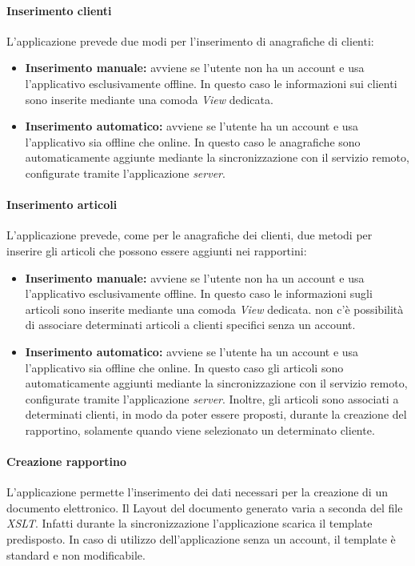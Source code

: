 \paragraph{Inserimento clienti}
L'applicazione prevede due modi per l'inserimento di anagrafiche di clienti:
\begin{itemize}
	\item \textbf{Inserimento manuale:} avviene se l'utente non ha un account e usa l'applicativo esclusivamente offline. In questo caso le informazioni sui clienti sono inserite mediante una comoda \textit{View} dedicata. 
	\item \textbf{Inserimento automatico:} avviene se l'utente ha un account e usa l'applicativo sia offline che online. In questo caso le anagrafiche sono automaticamente aggiunte mediante la sincronizzazione con il servizio remoto, configurate tramite l'applicazione \textit{server}.
\end{itemize}

\paragraph{Inserimento articoli}
L'applicazione prevede, come per le anagrafiche dei clienti, due metodi per inserire gli articoli che possono essere aggiunti nei rapportini:
\begin{itemize}
	\item \textbf{Inserimento manuale:} avviene se l'utente non ha un account e usa l'applicativo esclusivamente offline. In questo caso le informazioni sugli articoli sono inserite mediante una comoda \textit{View} dedicata. non c'è possibilità di associare determinati articoli a clienti specifici senza un account.
	\item \textbf{Inserimento automatico:} avviene se l'utente ha un account e usa l'applicativo sia offline che online. In questo caso gli articoli sono automaticamente aggiunti mediante la sincronizzazione con il servizio remoto, configurate tramite l'applicazione \textit{server}. Inoltre, gli articoli sono associati a determinati clienti, in modo da poter essere proposti, durante la creazione del rapportino, solamente quando viene selezionato un determinato cliente.
\end{itemize}

\paragraph{Creazione rapportino}
L'applicazione permette l'inserimento dei dati necessari per la creazione di un documento elettronico. Il Layout del documento generato varia a seconda del file \textit{XSLT}. Infatti durante la sincronizzazione l'applicazione scarica il template predisposto. In caso di utilizzo dell'applicazione senza un account, il template è standard e non modificabile. 